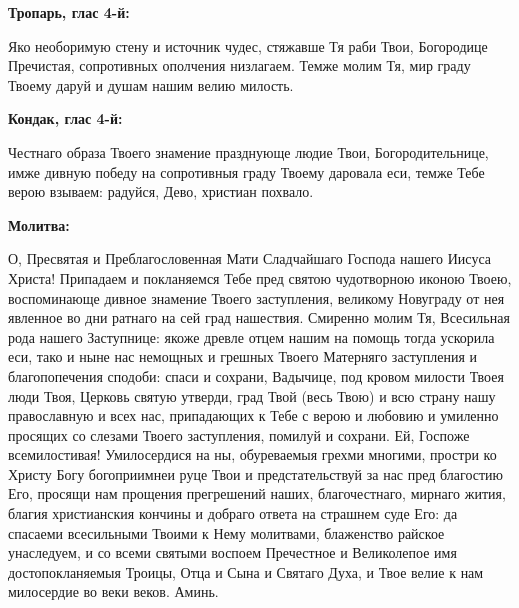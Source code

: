 \bfseries Тропарь, глас 4-й\normalfont{}:


Яко необоримую стену и источник чудес, стяжавше Тя раби Твои, Богородице Пречистая, сопротивных ополчения низлагаем. Темже молим Тя, мир граду Твоему даруй и душам нашим велию милость.


\medskip


\bfseries Кондак, глас 4-й\normalfont{}:


Честнаго образа Твоего знамение празднующе людие Твои, Богородительнице, имже дивную победу на сопротивныя граду Твоему даровала еси, темже Тебе верою взываем: радуйся, Дево, христиан похвало.


\medskip


\bfseries Молитва\normalfont{}:


О, Пресвятая и Преблагословенная Мати Сладчайшаго Господа нашего Иисуса Христа! Припадаем и покланяемся Тебе пред святою чудотворною иконою Твоею, воспоминающе дивное знамение Твоего заступления, великому Новуграду от нея явленное во дни ратнаго на сей град нашествия. Смиренно молим Тя, Всесильная рода нашего Заступнице: якоже древле отцем нашим на помощь тогда ускорила еси, тако и ныне нас немощных и грешных Твоего Матерняго заступления и благопопечения сподоби: спаси и сохрани, Вадычице, под кровом милости Твоея люди Твоя, Церковь святую утверди, град Твой (весь Твою) и всю страну нашу православную и всех нас, припадающих к Тебе с верою и любовию и умиленно просящих со слезами Твоего заступления, помилуй и сохрани. Ей, Госпоже всемилостивая! Умилосердися на ны, обуреваемыя грехми многими, простри ко Христу Богу богоприимнеи руце Твои и предстательствуй за нас пред благостию Его, просящи нам прощения прегрешений наших, благочестнаго, мирнаго жития, благия христианския кончины и добраго ответа на страшнем суде Его: да спасаеми всесильными Твоими к Нему молитвами, блаженство райское унаследуем, и со всеми святыми воспоем Пречестное и Великолепое имя достопокланяемыя Троицы, Отца и Сына и Святаго Духа, и Твое велие к нам милосердие во веки веков. Аминь.
\nopagebreak\bigskip\mychapterending
